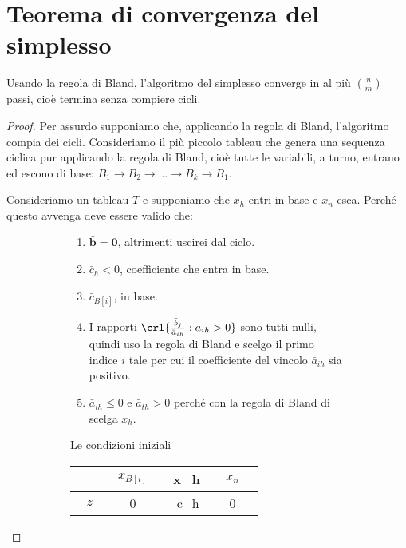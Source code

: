 \documentclass[\main/main.tex]{subfiles}
\begin{document}
\section{Teorema di convergenza del simplesso}

\begin{theorem}
  Usando la regola di Bland, l'algoritmo del simplesso converge in al più $\binom{n}{m}$ passi, cioè termina senza compiere cicli.
\end{theorem}

\begin{proof}
  Per assurdo supponiamo che, applicando la regola di Bland, l'algoritmo compia dei cicli. Consideriamo il più piccolo tableau che genera una sequenza ciclica pur applicando la regola di Bland, cioè tutte le variabili, a turno, entrano ed escono di base: $B_1 \rightarrow B_2 \rightarrow \ldots \rightarrow B_k \rightarrow B_1$.

  Consideriamo un tableau $T$ e supponiamo che $x_h$ entri in base e $x_n$ esca. Perché questo avvenga deve essere valido che:

  \begin{figure}
    \begin{subfigure}{0.49\textwidth}
      \begin{enumerate}
        \item $\bar{\bm{b}} = \bm{0}$, altrimenti uscirei dal ciclo.
        \item $\bar{c}_h < 0$, coefficiente che entra in base.
        \item $\bar{c}_{B[i]}$, in base.
        \item I rapporti $\crl{\frac{\bar{b}_j}{\bar{a}_{ih}}:\bar{a}_{ih}>0}$ sono tutti nulli, quindi uso la regola di Bland e scelgo il primo indice $i$ tale per cui il coefficiente del vincolo $\bar{a}_{ih}$ sia positivo.
        \item $\bar{a}_{ih} \leq 0$ e  $\bar{a}_{th} > 0$ perché con la regola di Bland di scelga $x_h$.
      \end{enumerate}
      \caption{Le condizioni iniziali}
    \end{subfigure}
    \begin{subfigure}{0.49\textwidth}
      \begin{table}
        \begin{tabular}{c|LcLLLc|L}
                       &  & $x_{B[i]}$ &  & x_h          &  & $x_n$ &   \\
          \hline
          $-z$         &  & 0          &  & \bar{c}_h    &  & 0     &   \\
          \hline


\end{tabular}
\end{table}
\end{subfigure}
\end{figure}
\end{proof}
\end{document}

